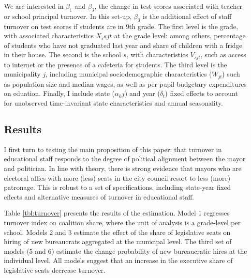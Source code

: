 \documentclass[12pt,a4paper]{article}
\begin{document}
We are interested in $\beta_1$ and $\beta_3$, the change in test scores associated with teacher or school principal turnover. In this set-up, $\beta_3$ is the additional effect of staff turnover on test scores if students are in 9th grade. The first level is the grade, with associated characteristics $X_isjt$ at the grade level: among others, percentage of students who have not graduated last year and share of children with a fridge in their house. The second is the school $s$, with characteristics $V_{sjt}$, such as access to internet or the presence of a cafeteria for students. The third level is the municipality $j$, including municipal sociodemographic characteristics ($W_{jt}$) such as population size and median wages, as well as per pupil budgetary expenditures on eduation. Finally, I include state ($\alpha_kj$) and year ($\delta_t$) fixed effects to account for unobserved time-invariant state characteristics and annual seasonality.


\subsection*{Results}

I first turn to testing the main proposition of this paper: that turnover in educational staff responds to the degree of political alignment between the mayor and politician. In line with theory, there is strong evidence that mayors who are electoral allies with more (less) seats in the city council resort to less (more) patronage. This is robust to a set of specifications, including state-year fixed effects and alternative measures of turnover in educational staff. 

Table \ref{tbl:turnover} presents the results of the estimation. Model 1 regresses turnover index on coalition share, where the unit of analysis is a grade-level per school. Models 2 and 3 estimate the effect of the share of legislative seats on hiring of new bureaucrats aggregated at the municipal level. The third set of models (5 and 6) estimate the change probability of new bureaucratic hires at the individual level. All models suggest that an increase in the executive share of legislative seats decrease turnover.
\end{document}
